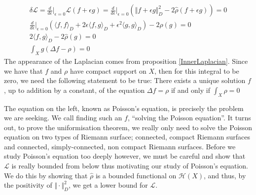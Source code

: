 \documentclass[11pt]{report}
\theoremstyle{definition}
\begin{document}
\begin{gather*}
  \delta \mathcal{L} = \frac{d}{d\epsilon}\biggr\rvert_{\epsilon = 0}\mathcal{L}(f+\epsilon g) = \frac{d}{d\epsilon}\biggr\rvert_{\epsilon = 0}(\Vert f+\epsilon g\Vert _D^2 -2\hat{\rho}(f+\epsilon g)) = 0 \\
  \frac{d}{d\epsilon}\biggr\rvert_{\epsilon = 0}(\langle f, f \rangle_D + 2\epsilon \langle f, g \rangle_D +\epsilon^2 \langle g, g \rangle_D) -2 \hat{\rho}(g) = 0 \\
  2\langle f, g \rangle_D -2\hat{\rho}(g) = 0 \\
  \int_X g(\Delta f - \rho) = 0 
\end{gather*}
\newpage
The appearance of the Laplacian comes from proposition \ref{InnerLaplacian}.
Since we have that $f$ and $\rho$ have compact support on $X$, then for this integral to be zero, we need the following statement to be true: There exists a unique solution $f$, up to addition by a constant, of the equation $\Delta f = \rho$ if and only if $\int_X \rho = 0$

The equation on the left, known as Poisson's equation, is precisely the problem we are seeking. We call finding such an $f$, ``solving the Poisson equation''. It turns out, to prove the uniformisation theorem, we really only need to solve the Poisson equation on two types of Riemann surface; connected, compact Riemann surfaces and connected, simply-connected, non compact Riemann surfaces. Before we study Poisson's equation too deeply however, we must be careful and show that $\mathcal{L}$ is really bounded from below thus motivating our study of Poisson's equation.  We do this by showing that $\hat{\rho}$ is a bounded functional on $\mathcal{H}(X)$, and thus, by the positivity of $\Vert \cdot \Vert^2_D$, we get a lower bound for $\mathcal{L}$.
\end{document}
